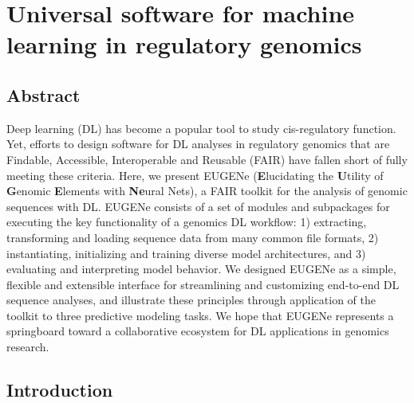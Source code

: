 \chapter{Universal software for machine learning in regulatory genomics}
\label{chap:chapter 1}

\section{Abstract}

Deep learning (DL) has become a popular tool to study cis-regulatory function. Yet, efforts to design software for DL analyses in regulatory genomics that are Findable, Accessible, Interoperable and Reusable (FAIR) have fallen short of fully meeting these criteria. Here, we present EUGENe (\textbf{E}lucidating the \textbf{U}tility of \textbf{G}enomic \textbf{E}lements with \textbf{Ne}ural Nets), a FAIR toolkit for the analysis of genomic sequences with DL. EUGENe consists of a set of modules and subpackages for executing the key functionality of a genomics DL workflow: 1) extracting, transforming and loading sequence data from many common file formats, 2) instantiating, initializing and training diverse model architectures, and 3) evaluating and interpreting model behavior. We designed EUGENe as a simple, flexible and extensible interface for streamlining and customizing end-to-end DL sequence analyses, and illustrate these principles through application of the toolkit to three predictive modeling tasks. We hope that EUGENe represents a springboard toward a collaborative ecosystem for DL applications in genomics research.

\section{Introduction}

